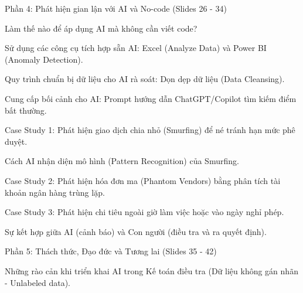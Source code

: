 \documentclass[aspectratio=169]{beamer}
\begin{document}
\begin{frame}{Phần 4: Phát hiện gian lận với AI và No-code (Slides 26 - 34)}
\end{frame}


\begin{frame}{Làm thế nào để áp dụng AI mà không cần viết code?}
\end{frame}


\begin{frame}{Sử dụng các công cụ tích hợp sẵn AI: Excel (Analyze Data) và Power BI (Anomaly Detection).}
\end{frame}


\begin{frame}{Quy trình chuẩn bị dữ liệu cho AI rà soát: Dọn dẹp dữ liệu (Data Cleansing).}
\end{frame}


\begin{frame}{Cung cấp bối cảnh cho AI: Prompt hướng dẫn ChatGPT/Copilot tìm kiếm điểm bất thường.}
\end{frame}


\begin{frame}{Case Study 1: Phát hiện giao dịch chia nhỏ (Smurfing) để né tránh hạn mức phê duyệt.}
\end{frame}


\begin{frame}{Cách AI nhận diện mô hình (Pattern Recognition) của Smurfing.}
\end{frame}


\begin{frame}{Case Study 2: Phát hiện hóa đơn ma (Phantom Vendors) bằng phân tích tài khoản ngân hàng trùng lặp.}
\end{frame}


\begin{frame}{Case Study 3: Phát hiện chi tiêu ngoài giờ làm việc hoặc vào ngày nghỉ phép.}
\end{frame}


\begin{frame}{Sự kết hợp giữa AI (cảnh báo) và Con người (điều tra và ra quyết định).}
\end{frame}


\begin{frame}{Phần 5: Thách thức, Đạo đức và Tương lai (Slides 35 - 42)}
\end{frame}


\begin{frame}{Những rào cản khi triển khai AI trong Kế toán điều tra (Dữ liệu không gán nhãn - Unlabeled data).}
\end{frame}
\end{document}
